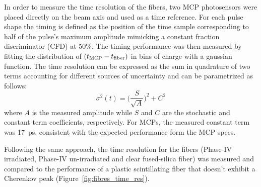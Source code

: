 \documentclass[a4paper,11pt]{article}
\begin{document}
In order to measure the time resolution of the fibers, two MCP photosensors were placed directly on the beam axis and used as a time reference. For each pulse shape the timing is defined as the position of the time sample corresponding to half of the pulse's maximum amplitude mimicking a constant fraction discriminator (CFD) at 50\%. The timing performance was then measured by fitting the distribution of $(t_{\rm MCP} - t_{\rm fiber})$ in bins of charge with a gaussian function.  The time resolution can be expressed as the sum in quadrature of two terms accounting for different sources of uncertainty and can be parametrized as follows:
\begin{equation}
    \sigma^2(t) = \bigg( \frac{S}{\sqrt{A}} \bigg)^2 + C^2
\end{equation}
where $A$ is the measured amplitude while $S$ and $C$ are the stochastic and constant term coefficients, respectively. For MCPs, the measured constant term was 17~ps, consistent with the expected performance form the MCP specs.

Following the same approach, the time resolution for the fibers (Phase-IV irradiated, Phase-IV un-irradiated and clear fused-silica fiber) was measured and compared to the performance of a plastic scintillating fiber that doesn't exhibit a Cherenkov peak (Figure~\ref{fig:fibres_time_res}).
\end{document}
